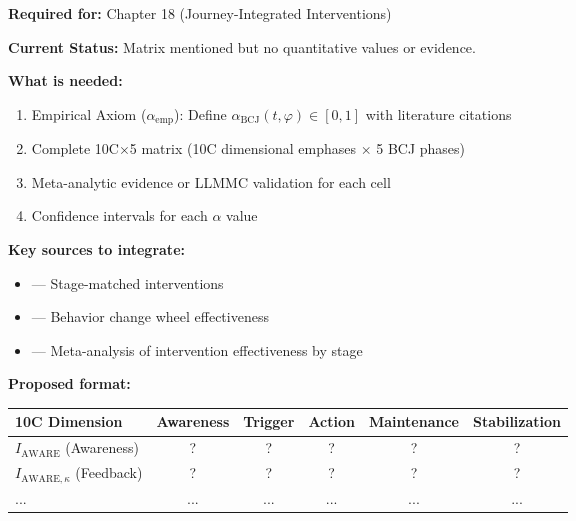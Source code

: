 \begin{tcolorbox}[colback=red!5!white, colframe=red!75!black,
    title=\textbf{TODO-IE-1: Phase-Type Affinity Matrix $\alpha_{\text{BCJ}}$}]

\textbf{Required for:} Chapter 18 (Journey-Integrated Interventions)

\textbf{Current Status:} Matrix mentioned but no quantitative values or evidence.

\textbf{What is needed:}
\begin{enumerate}[nosep]
    \item Empirical Axiom ($\alpha_{\text{emp}}$): Define $\alpha_{\text{BCJ}}(t, \varphi) \in [0,1]$ with literature citations
    \item Complete 10C$\times$5 matrix (10C dimensional emphases $\times$ 5 BCJ phases)
    \item Meta-analytic evidence or LLMMC validation for each cell
    \item Confidence intervals for each $\alpha$ value
\end{enumerate}

\textbf{Key sources to integrate:}
\begin{itemize}[nosep]
    \item \citet{PAP-prochaska1992stages} --- Stage-matched interventions
    \item \citet{michie2011behaviour} --- Behavior change wheel effectiveness
    \item \citet{webb2006does} --- Meta-analysis of intervention effectiveness by stage
\end{itemize}

\textbf{Proposed format:}
\begin{center}
\small
\begin{tabular}{l|ccccc}
10C Dimension & Awareness & Trigger & Action & Maintenance & Stabilization \\
\hline
$I_{\text{AWARE}}$ (Awareness) & ? & ? & ? & ? & ? \\
$I_{\text{AWARE},\kappa}$ (Feedback) & ? & ? & ? & ? & ? \\
... & ... & ... & ... & ... & ... \\
\end{tabular}
\end{center}

\end{tcolorbox}


